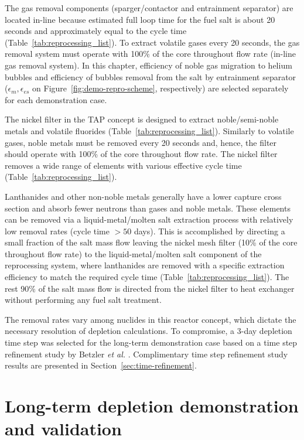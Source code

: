 The gas removal components (sparger/contactor and entrainment separator) are 
located in-line because estimated full loop time for the fuel salt is about 20 
seconds and approximately equal to the cycle time 
(Table~\ref{tab:reprocessing_list}). To extract volatile gases every 20 
seconds, the gas removal system must operate with 100\% of the core throughout 
flow rate (in-line gas removal system). In this chapter, efficiency of noble 
gas migration to helium bubbles and efficiency of bubbles removal from the 
salt by entrainment separator ($\epsilon_m,\epsilon_{es}$ on  
Figure~\ref{fig:demo-repro-scheme}, respectively) are selected separately for 
each demonstration case.

The nickel filter in the \gls{TAP} concept is designed to extract 
noble/semi-noble metals and volatile fluorides 
(Table~\ref{tab:reprocessing_list}). Similarly to volatile gases, 
noble metals must be removed every 20 seconds and, hence, the filter should 
operate with 100\% of the core throughout flow rate. The nickel filter removes 
a wide range of elements with various effective cycle time 
(Table~\ref{tab:reprocessing_list}).

Lanthanides and other non-noble metals generally have a lower capture  
cross section and absorb fewer neutrons than gases and noble metals. These 
elements can be removed via a liquid-metal/molten salt extraction process with 
relatively low removal rates (cycle time $> 50$ days). This is accomplished 
by directing a small fraction of the salt mass flow leaving the nickel mesh 
filter (10\% of the core throughout flow rate) to the liquid-metal/molten salt 
component of the reprocessing system, where lanthanides are removed with a 
specific extraction efficiency to match the  required cycle time 
(Table~\ref{tab:reprocessing_list}). The rest 90\% of the salt mass flow is 
directed from the nickel filter to heat exchanger without performing any fuel 
salt treatment.

The removal rates vary among nuclides in this reactor concept, which dictate 
the necessary resolution of depletion calculations. To compromise, a 3-day 
depletion time step was selected for the long-term demonstration case based on 
a time step refinement study by Betzler \emph{et al.} 
\cite{betzler_assessment_2017-1}. Complimentary time step refinement study 
results are presented in Section~\ref{sec:time-refinement}.

\section{Long-term depletion demonstration and validation}
